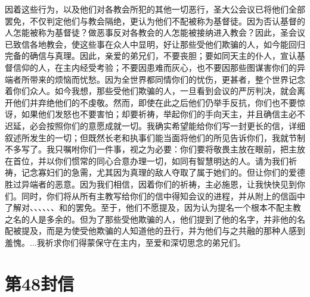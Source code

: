 因着这些行为，以及他们对各教会所犯的其他一切恶行，圣大公会议已将他们全部罢免，不仅判定他们与教会隔绝，更认为他们不配被称为基督徒。因为否认基督的人怎能被称为基督徒？做恶事反对各教会的人怎能被接纳进入教会？因此，圣会议已致信各地教会，使这些事在众人中显明，好让那些受他们欺骗的人，如今能回归完备的确信与真理。因此，亲爱的弟兄们，不要丧胆；要如同天主的仆人，宣认基督信仰的人，在主内经受考验；不要因患难而灰心，也不要因那些图谋害你们的异端者所带来的烦恼而忧愁。因为全世界都同情你们的忧伤，更甚者，整个世界记念着你们众人。如今我想，那些受他们欺骗的人，一旦看到会议的严厉判决，就会离开他们并弃绝他们的不虔敬。然而，即使在此之后他们仍举手反抗，你们也不要惊讶，如果他们发怒也不要害怕；却要祈祷，举起你们的手向天主，并且确信主必不迟延，必会按照你们的意愿成就一切。我确实希望能给你们写一封更长的信，详细叙述所发生的一切；但既然长老和执事们能当面将他们的所见告诉你们，我就节制不多写了。我只嘱咐你们一件事，视之为必要：你们要将敬畏主放在眼前，把主放在首位，并以你们惯常的同心合意办理一切，如同有智慧明达的人。请为我们祈祷，记念寡妇们的急需，尤其因为真理的敌人夺取了属于她们的。但让你们的爱德胜过异端者的恶意。因为我们相信，因着你们的祈祷，主必施恩，让我快快见到你们。同时，你们将从所有主教写给你们的信中得知会议的进程，并从附上的信函中了解对、、、、、、和的罢免。至于，他们不愿提及，因为认为提名一个根本不配主教之名的人是多余的。但为了那些受他欺骗的人，他们提到了他的名字，并非他的名配被提及，而是为使受他欺骗的人知道他的丑行，并为他们与之共融的那种人感到羞愧。...我祈求你们得蒙保守在主内，至爱和深切思念的弟兄们。\par



\section{第48封信}

\par

